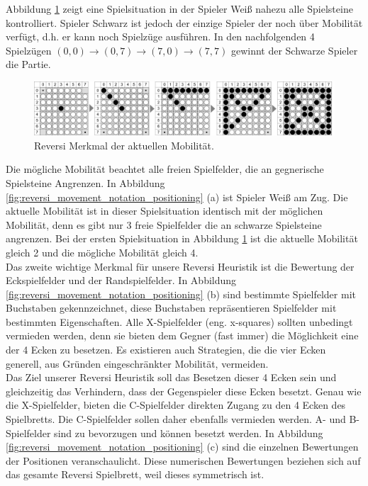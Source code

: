 Abbildung \ref{fig:reversi_maximum_disk_strategy} zeigt eine Spielsituation in der Spieler Weiß nahezu alle Spielsteine kontrolliert. Spieler Schwarz ist jedoch der einzige Spieler der noch über Mobilität verfügt, d.h. er kann noch Spielzüge ausführen. In den nachfolgenden 4 Spielzügen $(0,0) \rightarrow (0,7) \rightarrow (7,0) \rightarrow (7,7)$ gewinnt der Schwarze Spieler die Partie. \\
\newpage

\begin{figure}[!htbp]
  \centering
  \includegraphics[scale = 0.3]{inhalt/abbildungen/reversi_maximum_disk_strategy.pdf}
  \caption{Reversi Merkmal der aktuellen Mobilität.}
  \label{fig:reversi_maximum_disk_strategy}
\end{figure}

Die mögliche Mobilität beachtet alle freien Spielfelder, die an gegnerische Spielsteine Angrenzen. In Abbildung \ref{fig:reversi_movement_notation_positioning} (a) ist Spieler Weiß am Zug. Die aktuelle Mobilität ist in dieser Spielsituation identisch mit der möglichen Mobilität, denn es gibt nur 3 freie Spielfelder die an schwarze Spielsteine angrenzen. Bei der ersten Spielsituation in Abbildung \ref{fig:reversi_maximum_disk_strategy} ist die aktuelle Mobilität gleich 2 und die mögliche Mobilität gleich 4.\\

Das zweite wichtige Merkmal für unsere Reversi Heuristik ist die Bewertung der Eckspielfelder und der Randspielfelder. In Abbildung \ref{fig:reversi_movement_notation_positioning} (b) sind bestimmte Spielfelder mit Buchstaben gekennzeichnet, diese Buchstaben repräsentieren Spielfelder mit bestimmten Eigenschaften. Alle X-Spielfelder (eng. x-squares) sollten unbedingt vermieden werden, denn sie bieten dem Gegner (fast immer) die Möglichkeit eine der 4 Ecken zu besetzen. Es existieren auch Strategien, die die vier Ecken generell, aus Gründen eingeschränkter Mobilität, vermeiden. \\

Das Ziel unserer Reversi Heuristik soll das Besetzen dieser 4 Ecken sein und gleichzeitig das Verhindern, dass der Gegenspieler diese Ecken besetzt. Genau wie die X-Spielfelder, bieten die C-Spielfelder direkten Zugang zu den 4 Ecken des Spielbretts. Die C-Spielfelder sollen daher ebenfalls vermieden werden. A- und B-Spielfelder sind zu bevorzugen und können besetzt werden. In Abbildung \ref{fig:reversi_movement_notation_positioning} (c) sind die einzelnen Bewertungen der Positionen veranschaulicht. Diese numerischen Bewertungen beziehen sich auf das gesamte Reversi Spielbrett, weil dieses symmetrisch ist.


